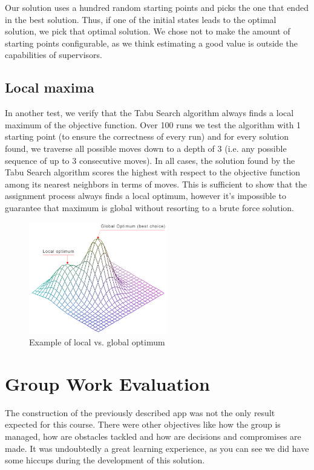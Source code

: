 Our solution uses a hundred random starting points and picks the one that ended in the best solution. Thus, if one of the initial states leads to the optimal solution, we pick that optimal solution. We chose not to make the amount of starting points configurable, as we think estimating a good value is outside the capabilities of supervisors.

\subsection{Local maxima}
In another test, we verify that the Tabu Search algorithm always finds a local maximum of the objective function. Over 100 runs we test the algorithm with 1 starting point (to ensure the correctness of every run) and for every solution found, we traverse all possible moves down to a depth of 3 (i.e. any possible sequence of up to 3 consecutive moves). In all cases, the solution found by the Tabu Search algorithm scores the highest with respect to the objective function among its nearest neighbors in terms of moves. This is sufficient to show that the assignment process always finds a local optimum, however it's impossible to guarantee that maximum is global without resorting to a brute force solution.

\begin{figure}[H]
	\caption{Example of local vs. global optimum}
	\label{fig:local_global_optimum}
	\centering
	\includegraphics[width=6cm]{img/local_global_optimum}
\end{figure}

\section{Group Work Evaluation}
The construction of the previously described app was not the only result expected for this course. There were other objectives like how the group is managed, how are obstacles tackled and how are decisions and compromises are made. It was undoubtedly a great learning experience, as you can see we did have some hiccups during the development of this solution. 

